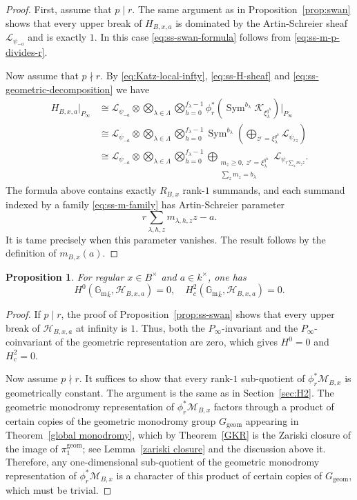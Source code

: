 \documentclass[11pt]{amsart}
\newtheorem{proposition}[theorem]{Proposition}
\theoremstyle{remark}
\newcommand{\Gm}{\mathbb G_{\mathrm m}}
\newcommand{\Sym}{\operatorname{Sym}}
\newcommand{\cK}{\mathcal K}
\newcommand{\cL}{\mathcal L}
\newcommand{\cH}{\mathcal H}
\newcommand{\geom}{\mathrm{geom}}
\begin{document}
\begin{proof}
First, assume that $p\mid r$. The same argument as in Proposition~\ref{prop:swan} shows that every upper break of $H_{B,x,a}$ is dominated by the Artin-Schreier sheaf $\cL_{\psi_{-a}}$ and is exactly $1$. In this case \eqref{eq:ss-swan-formula} follows from \eqref{eq:ss-m-p-divides-r}.

Now assume that $p\nmid r$. By \eqref{eq:Katz-local-infty}, \eqref{eq:ss-H-sheaf} and \eqref{eq:ss-geometric-decomposition} we have
\begin{align*}
H_{B,x,a}|_{P_\infty}&\cong\cL_{\psi_{-a}}\otimes
\bigotimes_{\lambda\in\Lambda}\bigotimes_{h=0}^{f_{\lambda}-1}
\phi_r^*(\Sym^{b_{\lambda}}\cK_{\xi_{\lambda}^{q^h}})|_{P_\infty}\\
&\cong\cL_{\psi_{-a}}\otimes\bigotimes_{\lambda\in\Lambda}
\bigotimes_{h=0}^{f_{\lambda}-1}
\Sym^{b_{\lambda}}\left(\bigoplus_{z^r=\xi_{\lambda}^{q^h}}\cL_{\psi_{rz}}\right)\\
&\cong\cL_{\psi_{-a}}\otimes
\bigotimes_{\lambda\in\Lambda}
\bigotimes_{h=0}^{f_{\lambda}-1}\bigoplus_{\substack{m_z\ge 0,~z^r=\xi_{\lambda}^{q^h}\\
\sum_z m_z=b_{\lambda}}}
\cL_{\psi_{r\sum_z m_z z}}.
\end{align*}
The formula above contains exactly $R_{B,x}$ rank-$1$ summands, and each summand indexed by a family
\eqref{eq:ss-m-family} has Artin-Schreier parameter
\[
r\sum_{\lambda,h,z}m_{\lambda,h,z}z-a.
\]
It is tame precisely when this parameter vanishes. The result follows by the definition of $m_{B,x}(a)$.
\end{proof}

\begin{proposition}\label{prop:ss-vanishing}
For regular $x\in B^{\times}$ and $a\in k^{\times}$, one has
\[
H^0({\Gm}_{\bar{k}},\cH_{B,x,a})=0, \quad H_c^2({\Gm}_{\bar{k}},\cH_{B,x,a})=0.
\]
\end{proposition}
\begin{proof}
If $p\mid r$, the proof of Proposition~\ref{prop:ss-swan} shows that every upper break of
$\cH_{B,x,a}$ at infinity is $1$. Thus, both the $P_\infty$-invariant and the $P_\infty$-coinvariant of the geometric representation are zero, which gives $H^0=0$ and $H_c^2=0$.

Now assume $p\nmid r$. It suffices to show that every rank-$1$ sub-quotient of $\phi_r^*\mathcal{M}_{B,x}$ is geometrically constant. The argument is the same as in Section~\ref{sec:H2}. The geometric monodromy representation of $\phi_r^*\mathcal{M}_{B,x}$ factors through a product of certain copies of the geometric monodromy group $G_\geom$ appearing in Theorem~\ref{global monodromy}, which by Theorem~\ref{GKR} is the Zariski closure of the image of $\pi_1^{\geom}$; see Lemma~\ref{zariski closure} and the discussion above it. Therefore, any one-dimensional sub-quotient of the geometric monodromy representation of $\phi_r^*\mathcal{M}_{B,x}$ is a character of this product of certain copies of $G_\geom$, which must be trivial.
\end{proof}
\end{document}
